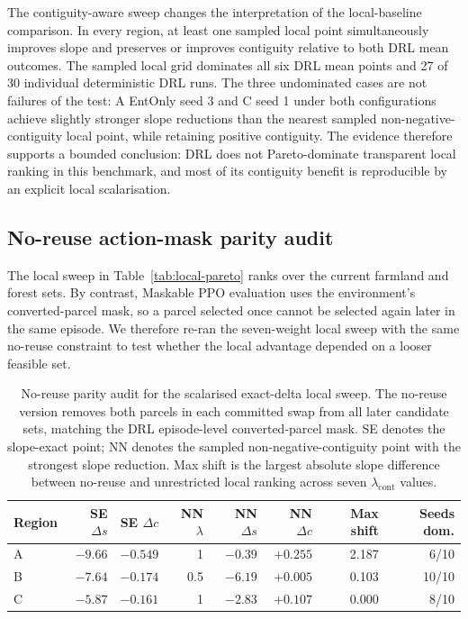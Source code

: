 \documentclass[]{interact}
\theoremstyle{plain}
\begin{document}
The contiguity-aware sweep changes the interpretation of the local-baseline comparison. In every region, at least one sampled local point simultaneously improves slope and preserves or improves contiguity relative to both DRL mean outcomes. The sampled local grid dominates all six DRL mean points and 27 of 30 individual deterministic DRL runs. The three undominated cases are not failures of the test: A EntOnly seed 3 and C seed 1 under both configurations achieve slightly stronger slope reductions than the nearest sampled non-negative-contiguity local point, while retaining positive contiguity. The evidence therefore supports a bounded conclusion: DRL does not Pareto-dominate transparent local ranking in this benchmark, and most of its contiguity benefit is reproducible by an explicit local scalarisation.

\subsection{No-reuse action-mask parity audit}\label{sec:results-mask-parity}

The local sweep in Table~\ref{tab:local-pareto} ranks over the current farmland and forest sets. By contrast, Maskable PPO evaluation uses the environment's converted-parcel mask, so a parcel selected once cannot be selected again later in the same episode. We therefore re-ran the seven-weight local sweep with the same no-reuse constraint to test whether the local advantage depended on a looser feasible set.

\begin{table}[htbp]
\centering
\caption{No-reuse parity audit for the scalarised exact-delta local sweep. The no-reuse version removes both parcels in each committed swap from all later candidate sets, matching the DRL episode-level converted-parcel mask. SE denotes the slope-exact point; NN denotes the sampled non-negative-contiguity point with the strongest slope reduction. Max shift is the largest absolute slope difference between no-reuse and unrestricted local ranking across seven $\lambda_{\mathrm{cont}}$ values.}
\label{tab:masked-local}
\scriptsize
\begin{tabular}{@{}lrrrrrrr@{}}
\toprule
Region & SE $\Delta s$ & SE $\Delta c$ & NN $\lambda$ & NN $\Delta s$ & NN $\Delta c$ & Max shift & Seeds dom. \\
\midrule
A & $-9.66$ & $-0.549$ & 1 & $-0.39$ & $+0.255$ & 2.187 & 6/10 \\
B & $-7.64$ & $-0.174$ & 0.5 & $-6.19$ & $+0.005$ & 0.103 & 10/10 \\
C & $-5.87$ & $-0.161$ & 1 & $-2.83$ & $+0.107$ & 0.000 & 8/10 \\
\bottomrule
\end{tabular}
\end{table}
\end{document}
